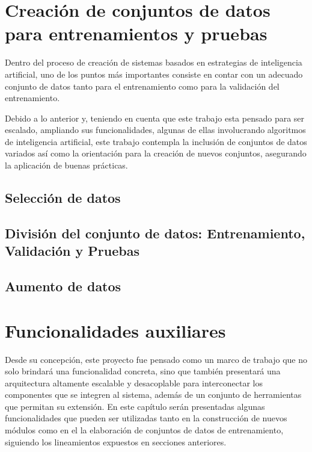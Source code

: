     \newpage

\section{Creación de conjuntos de datos para entrenamientos y pruebas}
\label{Sec:TrainValTestDataset}
    Dentro del proceso de creación de sistemas basados en estrategias de inteligencia artificial, uno de los puntos más importantes consiste en contar con un adecuado conjunto de datos tanto para el entrenamiento como para la validación del entrenamiento. 
    
    Debido a lo anterior y, teniendo en cuenta que este trabajo esta pensado para ser escalado, ampliando sus funcionalidades, algunas de ellas involucrando algoritmos de inteligencia artificial, este trabajo contempla la inclusión de conjuntos de datos variados así como la orientación para la creación de nuevos conjuntos, asegurando la aplicación de buenas prácticas.
    
    \subsection{Selección de datos}
    \label{sub:DatasetSelection}
    
    \subsection{División del conjunto de datos: Entrenamiento, Validación y Pruebas}
    \label{sub:DatasetSplit}
    
    \subsection{Aumento de datos}
    \label{sub:DatasetAugmented}
    
    \newpage

\section{Funcionalidades auxiliares}
\label{Sec:Tools}
    Desde su concepción, este proyecto fue pensado como un marco de trabajo que no solo brindará una funcionalidad concreta, sino que también presentará una arquitectura altamente escalable y desacoplable para interconectar los componentes que se integren al sistema, además de un conjunto de herramientas que permitan su extensión. En este capítulo serán presentadas algunas funcionalidades que pueden ser utilizadas tanto en la construcción de nuevos módulos como en el la elaboración de conjuntos de datos de entrenamiento, siguiendo los lineamientos expuestos en secciones anteriores.
    
